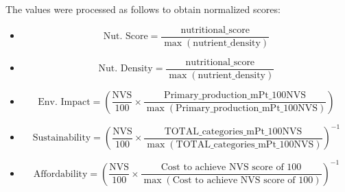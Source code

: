 \documentclass{oqireport}
\begin{document}
The values were processed as follows to obtain normalized scores:  

\begin{itemize}
\item 
    \begin{equation}
       \text{Nut. Score}=\frac{\text{nutritional\_score}}{\max(\text{nutrient\_density})}
    \end{equation}
\item 
    \begin{equation}
       \text{Nut. Density}=\frac{\text{nutritional\_score}}{\max(\text{nutrient\_density})}
    \end{equation}
    \item 
    \begin{equation}
       \text{Env. Impact}=\left(\frac{\text{NVS}}{100}\times\frac{\text{Primary\_production\_mPt\_100NVS}}{\max(\text{Primary\_production\_mPt\_100NVS})}\right)
    \end{equation}
    \item 
    \begin{equation}
       \text{Sustainability}=\left(\frac{\text{NVS}}{100}\times\frac{\text{TOTAL\_categories\_mPt\_100NVS}}{\max(\text{TOTAL\_categories\_mPt\_100NVS})}\right)^{-1}
    \end{equation}
    \item
    \begin{equation}
       \text{Affordability}=\left(\frac{\text{NVS}}{100}\times\frac{\text{Cost to achieve NVS score of 100}}{\max(\text{Cost to achieve NVS score of 100})}\right)^{-1}
    \end{equation}
\end{itemize}
\end{document}
